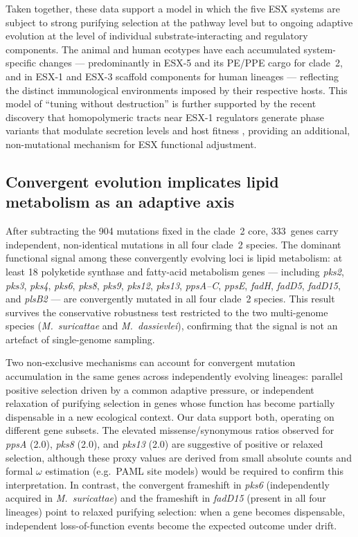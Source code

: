 \documentclass[11pt,a4paper]{article}
\newcommand{\Msur}{\textit{M.~suricattae}}
\newcommand{\Mdas}{\textit{M.~dassievlei}}
\begin{document}
Taken together, these data support a model in which the five ESX systems are
subject to strong purifying selection at the pathway level but to ongoing
adaptive evolution at the level of individual substrate-interacting and
regulatory components.
%
The animal and human ecotypes have each accumulated system-specific changes
--- predominantly in ESX-5 and its PE/PPE cargo for clade~2, and in
ESX-1 and ESX-3 scaffold components for human lineages --- reflecting the
distinct immunological environments imposed by their respective hosts.
%
This model of ``tuning without destruction'' is further supported by the
recent discovery that homopolymeric tracts near ESX-1 regulators generate
phase variants that modulate secretion levels and host fitness
\cite{Hartman2025}, providing an additional, non-mutational mechanism for
ESX functional adjustment.

\subsection{Convergent evolution implicates lipid metabolism as an adaptive axis}
\label{sec:disc:convergence}

After subtracting the 904 mutations fixed in the clade~2 core, 333~genes
carry independent, non-identical mutations in all four clade~2 species.
%
The dominant functional signal among these convergently evolving loci is
lipid metabolism: at least 18 polyketide synthase and fatty-acid metabolism genes
--- including \textit{pks2}, \textit{pks3}, \textit{pks4}, \textit{pks6},
\textit{pks8}, \textit{pks9}, \textit{pks12}, \textit{pks13}, \textit{ppsA--C},
\textit{ppsE}, \textit{fadH}, \textit{fadD5}, \textit{fadD15}, and \textit{plsB2}
--- are convergently mutated in all four clade~2 species.
%
This result survives the conservative robustness test restricted to the two
multi-genome species (\Msur{} and \Mdas{}), confirming that the signal is not
an artefact of single-genome sampling.

Two non-exclusive mechanisms can account for convergent mutation accumulation
in the same genes across independently evolving lineages: parallel positive
selection driven by a common adaptive pressure, or independent relaxation of
purifying selection in genes whose function has become partially dispensable
in a new ecological context.
%
Our data support both, operating on different gene subsets.
%
The elevated missense/synonymous ratios observed for \textit{ppsA} (2.0),
\textit{pks8} (2.0), and \textit{pks13} (2.0) are suggestive of positive or
relaxed selection, although these proxy values are derived from small absolute
counts and formal $\omega$ estimation (e.g.\ PAML site models) would be
required to confirm this interpretation.
%
In contrast, the convergent frameshift in \textit{pks6} (independently acquired in
\Msur{}) and the frameshift in \textit{fadD15} (present in all four lineages)
point to relaxed purifying selection: when a gene becomes dispensable, independent
loss-of-function events become the expected outcome under drift.
\end{document}
